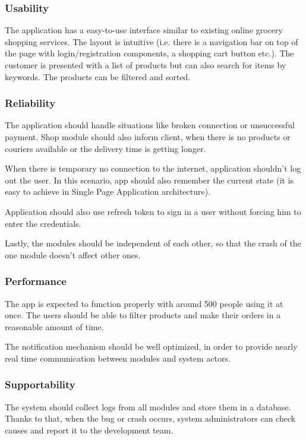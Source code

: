 \documentclass[../main.tex]{subfiles}
\begin{document}
\subsubsection{Usability}
The application has a easy-to-use interface similar to existing online grocery shopping services. The layout is intuitive (i.e. there is a navigation bar on top of the page with login/registration components, a shopping cart button etc.). The customer is presented with a list of products but can also search for items by keywords. The products can be filtered and sorted. 

\subsubsection{Reliability}
The application should handle situations like broken connection or unsuccessful payment. Shop module should also inform client, when there is no products or couriers available or the delivery time is getting longer.

When there is temporary no connection to the internet, application shouldn't log out the user. In this scenario, app should also remember the current state (it is easy to achieve in Single Page Application architecture).

Application should also use refresh token to sign in a user without forcing him to enter the credentials.

Lastly, the modules should be independent of each other, so that the crash of the one module doesn't affect other ones.


\subsubsection{Performance}
The app is expected to function properly with around 500 people using it at once. The users should be able to filter products and make their orders in a reasonable amount of time.

The notification mechanism should be well optimized, in order to provide nearly real time communication between modules and system actors.

\subsubsection{Supportability}

The system should collect logs from all modules and store them in a database. Thanks to that, when the bug or crash occurs, system administrators can check causes and report it to the development team.
\end{document}
